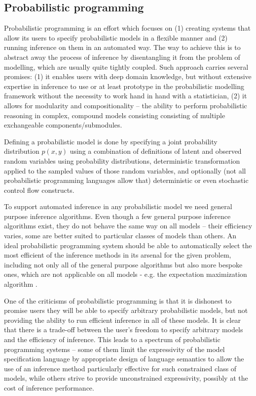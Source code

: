 \documentclass[12pt]{article}
\begin{document}
\subsection{Probabilistic programming}
Probabilistic programming is an effort which focuses on 
(1) creating systems that allow its users to specify probabilistic models in a flexible manner 
and 
(2) running inference on them in an automated way.
The way to achieve this is to abstract away the process of inference by disentangling it from the problem of modelling, which are usually quite tightly coupled.
Such approach carries several promises:
(1) it enables users with deep domain knowledge, but without extensive expertise in inference to use or at least prototype in the probabilistic modelling framework without the necessity to work hand in hand with a statistician,
(2) it allows for modularity and compositionality -- the ability to perform probabilistic reasoning in complex, compound models consisting consisting of multiple exchangeable components/submodules.

Defining a probabilistic model is done by specifying a joint probability distribution $p(x,y)$ using a combination of 
definitions of latent and observed random variables using probability distributions, 
deterministic transformation applied to the sampled values of those random variables, 
and optionally (not all probabilistic programming languages 
allow that) 
deterministic or even stochastic control flow constructs.  

To support automated inference in any probabilistic model we need general purpose inference algorithms.
Even though a few general purpose inference algorithms exist, they do not behave the same way on all models -- their efficiency varies, some are better suited to particular classes of models than others.
An ideal probabilistic programming system should be able to automatically select the most efficient of the inference methods in its arsenal for the given problem, including not only all of the general purpose algorithms but also more bespoke ones, which are not applicable on all models - e.g. the expectation maximization algorithm \citep{EM}.

One of the criticisms of probabilistic programming is that it is dishonest to promise users they will be able to specify arbitrary probabilistic models, but not providing the ability to run efficient inference in all of these models.
It is clear that there is a trade-off between the user's freedom to specify arbitrary models and the efficiency of inference.
This leads to a spectrum of probabilistic programming systems -- some of them limit the expressivity of the model specification language by appropriate design of language semantics to allow the use of an inference method particularly effective for such constrained class of models, while others strive to provide unconstrained expressivity, possibly at the cost of inference performance.
\end{document}
